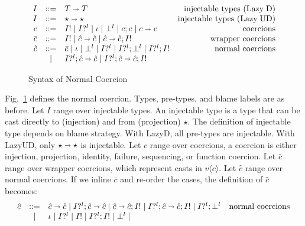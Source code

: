\documentclass[acmsmall,review,anonymous]{acmart}\settopmatter{printfolios=true,printccs=false,printacmref=false}
\newcommand{\figref}[1]{Fig.~\ref{#1}}
\newcommand{\stxrule}[3]{#1 & ::= & #3 & \text{#2}\\}
\newcommand{\stxrulecont}[1]{& | & #1 & \\}
\newcommand{\plus}[0]{+}
\newcommand{\lazyUD}{Lazy\;UD}
\newcommand{\lazyD}{Lazy\;D}
\newcommand{\TOOdyn}[0]{\star}
\newcommand{\POOfun}[2]{#1 \shortrightarrow #2}
\newcommand{\POOprod}[2]{#1 \times #2}
\newcommand{\POOsum}[2]{#1 \plus #2}
\newcommand{\vOOcast}[2]{#1\langle#2\rangle}
\newcommand{\ncProj}[2]{#1?^{#2}}
\newcommand{\ncInj}[1]{#1!}
\newcommand{\ncId}[0]{\iota}
\newcommand{\ncSeq}[2]{#1;#2}
\newcommand{\ncFail}[1]{\bot^{#1}}
\newcommand{\ncFun}[2]{\POOfun{#1}{#2}}
\newcommand{\ncProd}[2]{\POOprod{#1}{#2}}
\newcommand{\ncSum}[2]{\POOsum{#1}{#2}}
\begin{document}
\begin{figure}
	\[
	\begin{array}{rclr}
	\stxrule{I}{injectable types (\lazyD)}{
		\POOfun{T}{T}}
	\stxrule{I}{injectable types (\lazyUD)}{
		\POOfun{\TOOdyn}{\TOOdyn}
	}
	\stxrule{c}{coercions}{
		\ncInj{I} \mid
		\ncProj{I}{l} \mid
		\ncId \mid
		\ncFail{l} \mid
		\ncSeq{c}{c} \mid
		\ncFun{c}{c}
	}
	\stxrule{\bar{c}}{wrapper coercions}{	
		\ncInj{I} \mid
		\ncFun{\hat{c}}{\hat{c}} \mid
		\ncSeq{\ncFun{\hat{c}}{\hat{c}}}{\ncInj{I}}
	}
	\stxrule{\hat{c}}{normal coercions}{
		\bar{c} \mid
		\ncId \mid
		\ncFail{l} \mid
		\ncProj{I}{l} \mid
		\ncSeq{\ncProj{I}{l}}{\ncFail{l}} \mid
		\ncSeq{\ncProj{I}{l}}{\ncInj{I}}
	}
	\stxrulecont{
		\ncSeq{\ncProj{I}{l}}{\ncFun{\hat{c}}{\hat{c}}} \mid
		\ncSeq{\ncProj{I}{l}}{\ncSeq{\ncFun{\hat{c}}{\hat{c}}}{\ncInj{I}}}
	}
	\end{array}
	\]
	\caption{Syntax of Normal Coercion}
	\label{fig:normal-coercion}
\end{figure}


\figref{fig:normal-coercion} defines the normal coercion.
Types, pre-types, and blame labels are as before.
Let $ I $ range over injectable types. An injectable type is a type that can 
be cast directly to (injection) and from (projection) $ \TOOdyn $. The 
definition of injectable type depends on blame strategy. With \lazyD, all 
pre-types are injectable. With \lazyUD, only $ \POOfun{\TOOdyn}{\TOOdyn} $ 
is injectable. 
Let $ c $ range over coercions, a coercion is either injection, projection, 
identity, failure, sequencing, or function coercion.
Let $ \bar{c} $ range over wrapper coercions, which represent casts in $ 
\vOOcast{v}{c} $.
Let $ \hat{c} $ range over normal coercions. If we inline $ \bar{c} $ and 
re-order the cases, the definition of $ \hat{c} $ becomes:
\[
\begin{array}{rclr}
\stxrule{\hat{c}}{normal coercions}{
	\ncFun{\hat{c}}{\hat{c}} \mid
	\ncSeq{\ncProj{I}{l}}{\ncFun{\hat{c}}{\hat{c}}} \mid
	\ncSeq{\ncFun{\hat{c}}{\hat{c}}}{\ncInj{I}} \mid
	\ncSeq{\ncProj{I}{l}}{\ncSeq{\ncFun{\hat{c}}{\hat{c}}}{\ncInj{I}}} \mid
	\ncSeq{\ncProj{I}{l}}{\ncFail{l}}
}
\stxrulecont{
	\ncId \mid
	\ncProj{I}{l} \mid
	\ncInj{I} \mid
	\ncSeq{\ncProj{I}{l}}{\ncInj{I}} \mid
	\ncFail{l} \mid
}
\end{array}
\]
\end{document}

